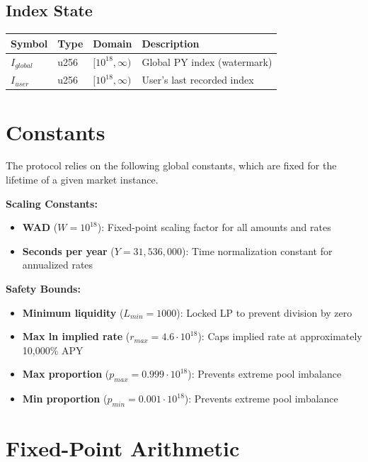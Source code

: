 \subsection{Index State}

\begin{center}
\begin{tabular}{llll}
\toprule
\textbf{Symbol} & \textbf{Type} & \textbf{Domain} & \textbf{Description} \\
\midrule
$I_{global}$ & u256 & $[10^{18}, \infty)$ & Global PY index (watermark) \\
$I_{user}$ & u256 & $[10^{18}, \infty)$ & User's last recorded index \\
\bottomrule
\end{tabular}
\end{center}

\section{Constants}

The protocol relies on the following global constants, which are fixed for the lifetime of a given market instance.

\textbf{Scaling Constants:}
\begin{itemize}
\item \textbf{WAD} ($W = 10^{18}$): Fixed-point scaling factor for all amounts and rates
\item \textbf{Seconds per year} ($Y = 31{,}536{,}000$): Time normalization constant for annualized rates
\end{itemize}

\textbf{Safety Bounds:}
\begin{itemize}
\item \textbf{Minimum liquidity} ($L_{min} = 1000$): Locked LP to prevent division by zero
\item \textbf{Max ln implied rate} ($r_{max} = 4.6 \cdot 10^{18}$): Caps implied rate at approximately 10,000\% APY
\item \textbf{Max proportion} ($p_{max} = 0.999 \cdot 10^{18}$): Prevents extreme pool imbalance
\item \textbf{Min proportion} ($p_{min} = 0.001 \cdot 10^{18}$): Prevents extreme pool imbalance
\end{itemize}

\section{Fixed-Point Arithmetic}

